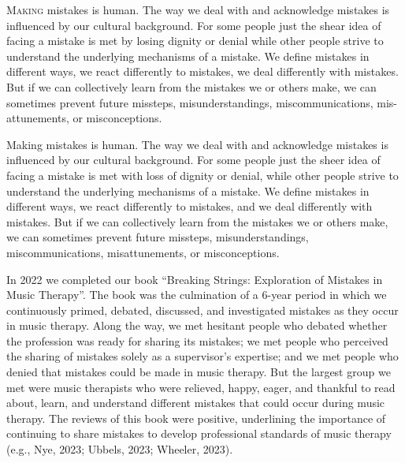 \documentclass[authordate, empirical, issue]{jote-new-article}
\author[1]{\mbox{Laurien Hakvoort}}
\affil[1]{ArtEZ University of the Arts}
\author[2]{\mbox{Avi Gilboa}}
\affil[2]{Bar Ilan University}
\begin{document}

\begin{frontmatter}
  \maketitle
  \begin{abstract}
    \printabstracttext
  \end{abstract}
\end{frontmatter}





\lettrine{M}{aking} mistakes is human. The way we deal with and acknowledge mistakes is influenced by our cultural background. For some people just the shear idea of facing a mistake is met by losing dignity or denial while other people strive to understand the underlying mechanisms of a mistake. We define mistakes in different ways, we react differently to mistakes, we deal differently with mistakes. But if we can collectively learn from the mistakes we or others make, we can sometimes prevent future missteps, misunderstandings, miscommunications, mis-attunements, or misconceptions.


Making mistakes is human. The way we deal with and acknowledge mistakes is influenced by our cultural background. For some people just the sheer idea of facing a mistake is met with loss of dignity or denial, while other people strive to understand the underlying mechanisms of a mistake. We define mistakes in different ways, we react differently to mistakes, and we deal differently with mistakes. But if we can collectively learn from the mistakes we or others make, we can sometimes prevent future missteps, misunderstandings, miscommunications, misattunements, or misconceptions.



In 2022 we completed our book “Breaking Strings: Exploration of Mistakes in Music Therapy”. The book was the culmination of a 6-year period in which we continuously primed, debated, discussed, and investigated mistakes as they occur in music therapy. Along the way, we met hesitant people who debated whether the profession was ready for sharing its mistakes; we met people who perceived the sharing of mistakes solely as a supervisor's expertise; and we met people who denied that mistakes could be made in music therapy. But the largest group we met were music therapists who were relieved, happy, eager, and thankful to read about, learn, and understand different mistakes that could occur during music therapy. The reviews of this book were positive, underlining the importance of continuing to share mistakes to develop professional standards of music therapy (e.g., Nye, 2023; Ubbels, 2023; Wheeler, 2023).
\end{document}
